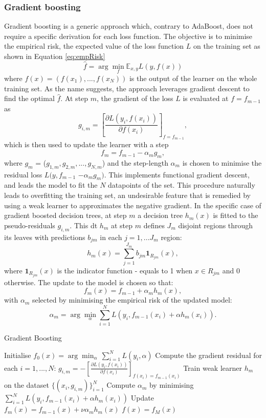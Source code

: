\subsubsection{Gradient boosting}\label{sec-gradient-boost}
Gradient boosting is a generic approach which, contrary to AdaBoost, does not require a specific derivation for each loss function. The objective is to minimise the empirical risk, the expected value of the loss function $L$ on the training set as shown in Equation \ref{eq:empRisk} 
\begin{equation}\label{eq:empRisk}
    \hat{f}  = \arg \min_f \mathbb{E}_{x,y} L(y, f(x))
\end{equation}
where $f(x) = (f(x_1), ..., f(x_N))$ is the output of the learner on the whole training set. As the name suggests, the approach leverages gradient descent to find the optimal $\hat{f}$. At step $m$, the gradient of the loss $L$ is evaluated at $f = f_{m-1}$ as \[ g_{i,m} = \left[ \frac{\partial  L(y_i, f(x_i))}{\partial f(x_i)} \right]_{f= f_{m-1}}, \] which is then used to update the learner with a step \[ f_m = f_{m-1} - \alpha_m g_{m},\] where $g_m$ = ($g_{1, m}, g_{2, m}, ..., g_{N,m}$) and the step-length $\alpha_m$ is chosen to minimise the residual loss $L(y, f_{m-1}$ $- \alpha_m g_{m})$. This implements functional gradient descent, and leads the model to fit the $N$ datapoints of the set. This procedure naturally leads to overfitting the training set, an undesirable feature that is remedied by using a weak learner to approximates the negative gradient. In the specific case of gradient boosted decision trees, at step $m$ a decision tree $h_m(x)$ is fitted to the pseudo-residuals $g_{i,m}$. This \gls{dt} $h_m$ at step $m$ defines $J_m$ disjoint regions through its leaves with predictions $b_{jm}$ in each $j = 1, ... J_m$ region: \[ h_m(x) = \sum_{j=1}^{J_m} b_{jm} \textbf{1}_{R_{jm}}(x),\] where $\textbf{1}_{R_{jm}}(x)$ is the indicator function - equals to 1 when $x \in R_{jm}$ and 0 otherwise. The update to the model is chosen so that: \[f_m(x) = f_{m-1} + \alpha_m h_m(x),\] with $\alpha_m$ selected by minimising the empirical risk of the updated model: \[ \alpha_m = \arg \min_{\alpha} \sum_{i=1}^N L(y_i, f_{m-1}(x_i) + \alpha h_m(x_i)).\]

\begin{algorithm}
    \caption{Gradient Boosting \cite{MurphyML}}
    \label{algo:gradient_boosting}
    \begin{algorithmic}
    \State Initialise $f_0(x) = \arg\min_\alpha \,\sum_{i=1}^N L(y_i, \alpha)$
        \State Compute the gradient residual for each $i= 1, ..., N$: $g_{i,m} = -\left[\frac{\partial L(y_i, f(x_i))}{\partial f(x_i)}\right]_{f(x_i) = f_{m-1}(x_i)}$
        \State Train weak learner $h_m$ on the dataset $\{(x_i, g_{i,m})\}_{i=1}^N$
        \State Compute $\alpha_m$ by minimising $\sum_{i=1}^N L(y_i, f_{m-1}(x_i) + \alpha h_m(x_i))$
        \State Update $f_m(x) = f_{m-1}(x) + \nu \alpha_m h_m(x)$
    \EndFor
    \State \Return $f(x) = f_M(x)$
    \end{algorithmic}
\end{algorithm}

